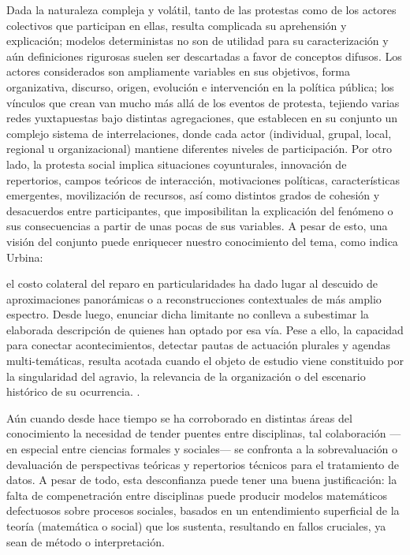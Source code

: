 \documentclass[letterpaper, 11pt]{book}
\theoremstyle{definition}
\theoremstyle{remark}
\begin{document}
Dada la naturaleza compleja y volátil, tanto de las protestas como de los actores colectivos que participan en ellas, resulta complicada su aprehensión y explicación; modelos deterministas no son de utilidad para su caracterización y aún definiciones rigurosas suelen ser descartadas a favor de conceptos difusos. 
Los actores considerados son ampliamente variables en sus objetivos, forma organizativa, discurso, origen, evolución e intervención en la política pública; los vínculos que crean van mucho más allá de los eventos de protesta, tejiendo varias redes yuxtapuestas bajo distintas agregaciones, que establecen en su conjunto un complejo sistema de interrelaciones, donde cada actor (individual, grupal, local, regional u organizacional) mantiene diferentes niveles de participación. 
Por otro lado, la protesta social implica situaciones coyunturales, innovación de repertorios, campos teóricos de interacción, motivaciones políticas, características emergentes, movilización de recursos, así como distintos grados de cohesión y desacuerdos entre participantes, que imposibilitan la explicación del fenómeno o sus consecuencias a partir de unas pocas de sus variables. 
A pesar de esto, una visión del conjunto puede enriquecer nuestro conocimiento del tema, como indica Urbina:


\begin{center}
    \begin{minipage}{0.9\linewidth}
        {\setlength{\parindent}{12pt}\small
        el costo colateral del reparo en particularidades ha dado lugar al descuido de aproximaciones panorámicas o a reconstrucciones contextuales de más amplio espectro. Desde luego, enunciar dicha limitante no conlleva a subestimar la elaborada descripción de quienes han optado por esa vía. Pese a ello, la capacidad para conectar acontecimientos, detectar pautas de actuación plurales y agendas multi-temáticas, resulta acotada cuando el objeto de estudio viene constituido por la singularidad del agravio, la relevancia de la organización o del escenario histórico de su ocurrencia. \normalsize \citep[34]{2017_Urbina_estudiantes}.
        }
    \end{minipage}
\end{center}


Aún cuando desde hace tiempo se ha corroborado en distintas áreas del conocimiento la necesidad de tender puentes entre disciplinas, tal colaboración ---en especial entre ciencias formales y sociales--- 
se confronta a la sobrevaluación o devaluación de perspectivas teóricas y repertorios técnicos para el tratamiento de datos. 
A pesar de todo, esta desconfianza puede tener una buena justificación: la falta de compenetración entre disciplinas puede producir modelos matemáticos defectuosos sobre procesos sociales, basados en un entendimiento superficial de la teoría (matemática o social) que los sustenta, resultando en fallos cruciales, ya sean de método o interpretación. 
\end{document}
